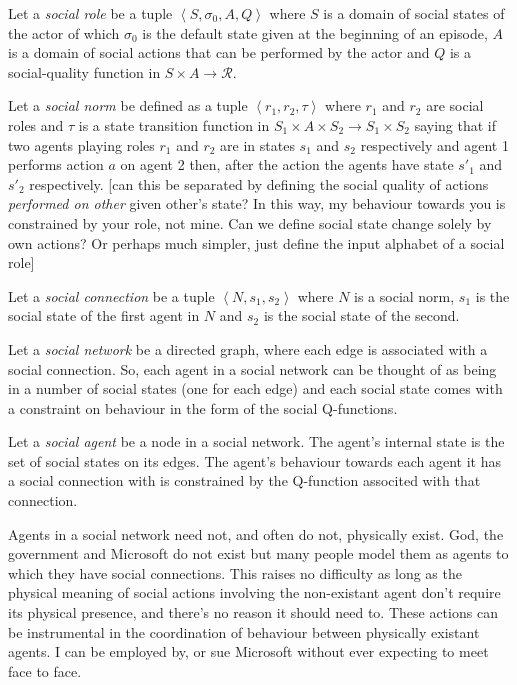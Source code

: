 \documentclass[a4paper]{article}
\begin{document}
Let a \textit{social role} be a tuple $\left<S, \sigma_0, A, Q\right>$ where $S$ is a domain of social states of the actor of which $\sigma_0$ is the default state given at the beginning of an episode, $A$ is a domain of social actions that can be performed by the actor and $Q$ is a social-quality function in $S \times A \to \mathcal{R}$. 

Let a \textit{social norm} be defined as a tuple $\left<r_1, r_2, \tau \right>$ where $r_1$ and $r_2$ are social roles and $\tau$ is a state transition function in $S_1 \times A \times S_2 \to S_1 \times S_2$ saying that if two agents playing roles $r_1$ and $r_2$ are in states $s_1$ and $s_2$ respectively and agent 1 performs action $a$ on agent 2 then, after the action the agents have state $s'_1$ and $s'_2$ respectively. [can this be separated by defining the social quality of actions \textit{performed on other} given other's state? In this way, my behaviour towards you is constrained by your role, not mine. Can we define social state change solely by own actions? Or perhaps much simpler, just define the input alphabet of a social role]

Let a \textit{social connection} be a tuple $\left<N, s_1, s_2 \right>$ where $N$ is a social norm, $s_1$ is the social state of the first agent in $N$ and $s_2$ is the social state of the second.

Let a \textit{social network} be a directed graph, where each edge is associated with a social connection. So, each agent in a social network can be thought of as being in a number of social states (one for each edge) and each social state comes with a constraint on behaviour in the form of the social Q-functions.

Let a \textit{social agent} be a node in a social network. The agent's internal state is the set of social states on its edges. The agent's behaviour towards each agent it has a social connection with is constrained by the Q-function associted with that connection.

Agents in a social network need not, and often do not, physically exist. God, the government and Microsoft do not exist but many people model them as agents to which they have social connections. This raises no difficulty as long as the physical meaning of social actions involving the non-existant agent don't require its physical presence, and there's no reason it should need to. These actions can be instrumental in the coordination of behaviour between physically existant agents. I can be employed by, or sue Microsoft without ever expecting to meet face to face.
\end{document}
